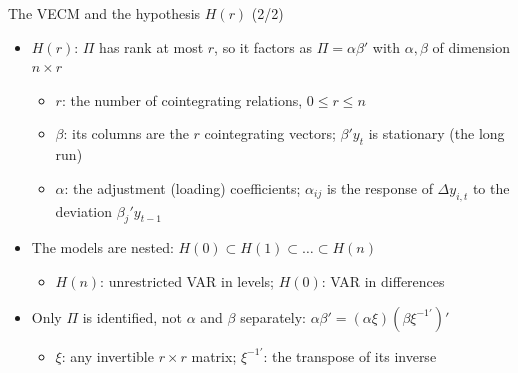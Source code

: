 \begin{frame}{The VECM and the hypothesis $H(r)$ (2/2)}
\itemsize{\small}
\begin{itemize}
    \item $H(r)$: $\Pi$ has rank at most $r$, so it factors as $\Pi = \alpha\beta'$ with $\alpha, \beta$ of dimension $n\times r$
    \begin{itemize}
        \item $r$: the number of cointegrating relations, $0 \le r \le n$
        \item $\beta$: its columns are the $r$ cointegrating vectors; $\beta'y_t$ is stationary (the long run)
        \item $\alpha$: the adjustment (loading) coefficients; $\alpha_{ij}$ is the response of $\Delta y_{i,t}$ to the deviation $\beta_j'y_{t-1}$
    \end{itemize}
    \item The models are nested: $H(0) \subset H(1) \subset \dots \subset H(n)$
    \begin{itemize}
        \item $H(n)$: unrestricted VAR in levels; $H(0)$: VAR in differences
    \end{itemize}
    \item Only $\Pi$ is identified, not $\alpha$ and $\beta$ separately: $\alpha\beta' = (\alpha\xi)(\beta\xi^{-1\prime})'$
    \begin{itemize}
        \item $\xi$: any invertible $r\times r$ matrix; $\xi^{-1\prime}$: the transpose of its inverse
    \end{itemize}
\end{itemize}
\end{frame}

